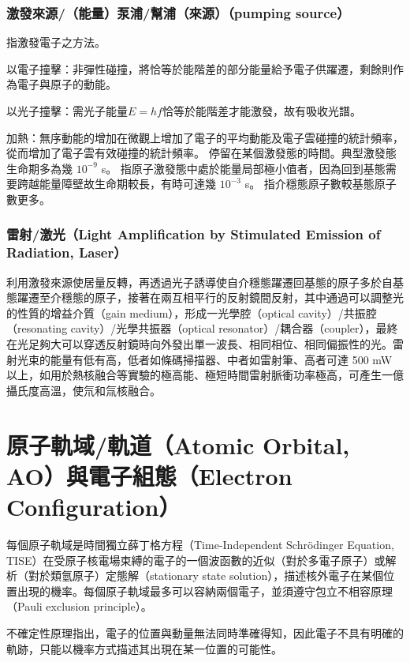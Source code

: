 \documentclass[a4paper,12pt]{report}
\begin{document}
\subsubsection{激發來源/（能量）泵浦/幫浦（來源）（pumping source）}
指激發電子之方法。
\bit
\item 以電子撞擊：非彈性碰撞，將恰等於能階差的部分能量給予電子供躍遷，剩餘則作為電子與原子的動能。
\item 以光子撞擊：需光子能量$E = hf$恰等於能階差才能激發，故有吸收光譜。
\item 加熱：無序動能的增加在微觀上增加了電子的平均動能及電子雲碰撞的統計頻率，從而增加了電子雲有效碰撞的統計頻率。
\eit
{}
停留在某個激發態的時間。典型激發態生命期多為幾 $10^{-9}$ s。
指原子激發態中處於能量局部極小值者，因為回到基態需要跨越能量障壁故生命期較長，有時可達幾 $10^{-3}$ s。
指介穩態原子數較基態原子數更多。
\subsubsection{雷射/激光（Light Amplification by Stimulated Emission of Radiation, Laser）}
利用激發來源使居量反轉，再透過光子誘導使自介穩態躍遷回基態的原子多於自基態躍遷至介穩態的原子，接著在兩互相平行的反射鏡間反射，其中通過可以調整光的性質的增益介質（gain medium），形成一光學腔（optical cavity）/共振腔（resonating cavity）/光學共振器（optical resonator）/耦合器（coupler），最終在光足夠大可以穿透反射鏡時向外發出單一波長、相同相位、相同偏振性的光。雷射光束的能量有低有高，低者如條碼掃描器、中者如雷射筆、高者可達 500 mW 以上，如用於熱核融合等實驗的極高能、極短時間雷射脈衝功率極高，可產生一億攝氏度高溫，使氘和氚核融合。


\section{原子軌域/軌道（Atomic Orbital, AO）與電子組態（Electron Configuration）}
每個原子軌域是時間獨立薛丁格方程（Time-Independent Schrödinger Equation, TISE）在受原子核電場束縛的電子的一個波函數的近似（對於多電子原子）或解析（對於類氫原子）定態解（stationary state solution），描述核外電子在某個位置出現的機率。每個原子軌域最多可以容納兩個電子，並須遵守包立不相容原理（Pauli exclusion principle）。

不確定性原理指出，電子的位置與動量無法同時準確得知，因此電子不具有明確的軌跡，只能以機率方式描述其出現在某一位置的可能性。
\end{document}
